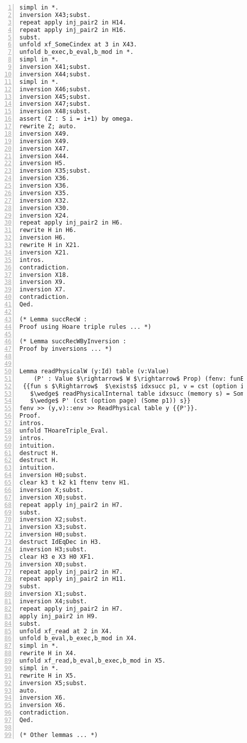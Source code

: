 \begin{appendices}
\begin{lstlisting}[xleftmargin=-.1\textwidth,
xrightmargin=-.1\textwidth,
mathescape=true,numbers=left]
simpl in *.
inversion X43;subst.
repeat apply inj_pair2 in H14.
repeat apply inj_pair2 in H16.
subst.
unfold xf_SomeCindex at 3 in X43.
unfold b_exec,b_eval,b_mod in *.
simpl in *.
inversion X41;subst.
inversion X44;subst.
simpl in *.
inversion X46;subst.
inversion X45;subst.
inversion X47;subst.
inversion X48;subst.
assert (Z : S i = i+1) by omega.
rewrite Z; auto.
inversion X49.
inversion X49.
inversion X47.
inversion X44.
inversion H5.
inversion X35;subst.
inversion X36.
inversion X36.
inversion X35.
inversion X32.
inversion X30.
inversion X24.
repeat apply inj_pair2 in H6.
rewrite H in H6.
inversion H6.
rewrite H in X21.
inversion X21.
intros.
contradiction.
inversion X18.
inversion X9.
inversion X7.
contradiction.
Qed.

(* Lemma succRecW : 
Proof using Hoare triple rules ... *)

(* Lemma succRecWByInversion : 
Proof by inversions ... *)


Lemma readPhysicalW (y:Id) table (v:Value) 
	(P' : Value $\rightarrow$ W $\rightarrow$ Prop) (fenv: funEnv) (env: valEnv) :
 {{fun s $\Rightarrow$  $\exists$ idxsucc p1, v = cst (option index) (Some idxsucc)
   $\wedge$ readPhysicalInternal table idxsucc (memory s) = Some p1 
   $\wedge$ P' (cst (option page) (Some p1)) s}} 
fenv >> (y,v)::env >> ReadPhysical table y {{P'}}.
Proof.
intros.
unfold THoareTriple_Eval.
intros.
intuition.
destruct H.
destruct H.
intuition.
inversion H0;subst.
clear k3 t k2 k1 ftenv tenv H1.
inversion X;subst.
inversion X0;subst.
repeat apply inj_pair2 in H7.
subst.
inversion X2;subst.
inversion X3;subst.
inversion H0;subst.
destruct IdEqDec in H3.
inversion H3;subst.
clear H3 e X3 H0 XF1. 
inversion X0;subst.
repeat apply inj_pair2 in H7.
repeat apply inj_pair2 in H11.
subst.
inversion X1;subst.
inversion X4;subst.
repeat apply inj_pair2 in H7.
apply inj_pair2 in H9.
subst.
unfold xf_read at 2 in X4.
unfold b_eval,b_exec,b_mod in X4.
simpl in *.
rewrite H in X4.
unfold xf_read,b_eval,b_exec,b_mod in X5.
simpl in *.
rewrite H in X5.
inversion X5;subst.
auto.
inversion X6.
inversion X6.
contradiction.
Qed.

(* Other lemmas ... *)

\end{lstlisting}

\end{appendices}



